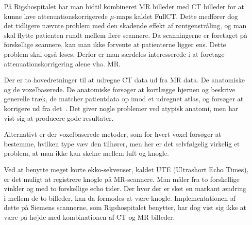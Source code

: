På Rigshospitalet har man hidtil kombineret MR billeder med CT billeder
for at kunne lave attenuationskorrigerede $\mu$-maps kaldet FullCT.
Dette medfører dog det tidligere nævnte problem med den skadende
effekt af røntgenstråling, og man skal flytte patienten rundt mellem
flere scannere. Da scanningerne er foretaget på forskellige scannere,
kan man ikke forvente at patienterne ligger ens. Dette problem skal
også løses. Derfor er man særdeles interesserede i at foretage
attenuationskorrigering alene vha. MR.

Der er to hovedretninger til at udregne CT data ud fra MR data. De
anatomiske og de voxelbaserede. De anatomiske forsøger at kortlægge
hjernen og beskrive generelle træk, de matcher patientdata op imod
et udregnet atlas, og forsøger at korrigere ud fra det~\cite{atlas1,
atlas2}. Det giver nogle problemer ved atypisk anatomi, men har vist sig
at producere gode resultater.

Alternativt er der voxelbaserede metoder, som for hvert voxel forsøger
at bestemme, hvilken type væv den tilhører, men her er det selvfølgelig
virkelig et problem, at man ikke kan skelne mellem luft og knogle.

Ved at benytte meget korte ekko-sekvenser, kaldet UTE (Ultrashort Echo
Times), er det muligt at registrere knogle på MR-scannere. Man måler fra
to forskellige vinkler og med to forskellige echo tider. Der hvor der er
sket en markant ændring i mellem de to billeder, kan da formodes at være
knogle. Implementationen af dette på Siemens scannerne, som Rigshospitalet
benytter, har dog vist sig ikke at være på højde med kombinationen af
CT og MR billeder.

